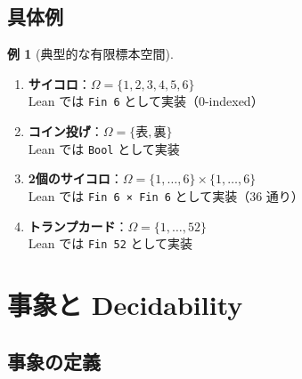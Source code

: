 \documentclass[12pt,a4paper,ja=standard]{bxjsarticle}
\theoremstyle{definition}
\newtheorem{example}[definition]{例}
\begin{document}
\subsection{具体例}

\begin{example}[典型的な有限標本空間]
\begin{enumerate}
    \item \textbf{サイコロ}：$\Omega = \{1, 2, 3, 4, 5, 6\}$ \\
    Lean では \texttt{Fin 6} として実装（0-indexed）
    
    \item \textbf{コイン投げ}：$\Omega = \{\text{表}, \text{裏}\}$ \\
    Lean では \texttt{Bool} として実装
    
    \item \textbf{2個のサイコロ}：$\Omega = \{1,\ldots,6\} \times \{1,\ldots,6\}$ \\
    Lean では \texttt{Fin 6 × Fin 6} として実装（36 通り）
    
    \item \textbf{トランプカード}：$\Omega = \{1,\ldots,52\}$ \\
    Lean では \texttt{Fin 52} として実装
\end{enumerate}
\end{example}

\begin{center}
\end{center}

\section{事象と Decidability}\label{sec:events}

\subsection{事象の定義}
\end{document}
